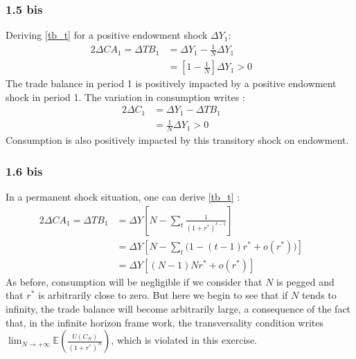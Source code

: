 \documentclass{article}
\begin{document}
\subsubsection*{1.5 bis}
Deriving \eqref{tb_t} for a positive endowment shock $\Delta Y_1$:
\begin{alignat*}{2}
    \Delta CA_1 = \Delta TB_1 &= \Delta Y_1 - \frac{1}{N} \Delta Y_1 \quad&\\
    &= \left[ 1 - \frac{1}{N}\right] \Delta Y_1 > 0 \quad&
    \label{Delta_tb}
\end{alignat*}
The trade balance in period 1 is positively impacted by a positive endowment shock in period 1. The variation in consumption writes :
\begin{alignat*}{2}
    \Delta C_1 &= \Delta Y_1 - \Delta TB_1 \quad&\\
    &= \frac{1}{N} \Delta Y_1 > 0 \quad&
\end{alignat*}
Consumption is also positively impacted by this transitory shock on endowment.
\subsubsection*{1.6 bis}
In a permanent shock situation, one can derive \eqref{tb_t} :
\begin{alignat*}{2}
    \Delta CA_1 = \Delta TB_1 &= \Delta Y \left[N - \sum_t \frac{1}{(1+r^*)^{t-1}} \right]\quad&\\
    &= \Delta Y \left[N - \sum_t \Big(1 - (t-1)r^* + o(r^*) \Big)\right] \quad&\\
    &= \Delta Y \left[(N-1)N r^* + o(r^*) \right]\quad&
\end{alignat*}
As before, consumption will be negligible if we consider that $N$ is pegged and that $r^*$ is arbitrarily close to zero. But here we begin to see that if $N$ tends to infinity, the trade balance will become arbitrarily large, a consequence of the fact that, in the infinite horizon frame work, the transversality condition writes $\lim_{N \to +\infty} \mathbb{E}(\frac{U(C_N)}{(1+r^*)^N})$, which is violated in this exercise.
\end{document}
